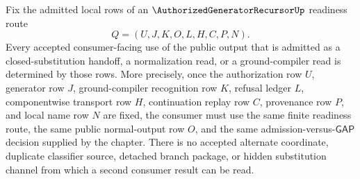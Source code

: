 \begin{corollary}
\label{cor:authorized-generator-recursor-readiness-consumer-determinacy}
Fix the admitted local rows of an $\AuthorizedGeneratorRecursorUp$ readiness route
$$
Q=(U,J,K,O,L,H,C,P,N).
$$
Every accepted consumer-facing use of the public output that is admitted as a closed-substitution handoff, a normalization read, or a ground-compiler read is determined by those rows. More precisely, once the authorization row $U$, generator row $J$, ground-compiler recognition row $K$, refusal ledger $L$, componentwise transport row $H$, continuation replay row $C$, provenance row $P$, and local name row $N$ are fixed, the consumer must use the same finite readiness route, the same public normal-output row $O$, and the same admission-versus-$\mathsf{GAP}$ decision supplied by the chapter. There is no accepted alternate coordinate, duplicate classifier source, detached branch package, or hidden substitution channel from which a second consumer result can be read.
\end{corollary}
